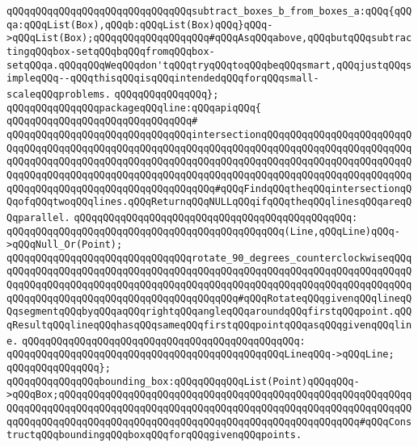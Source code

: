\newline
\verb|qQQqqQQqqQQqqQQqqQQqqQQqqQQqqQQqsubtract_boxes_b_from_boxes_a:qQQq{qQQqa:qQQqList(Box),qQQqb:qQQqList(Box)qQQq}qQQq->qQQqList(Box);qQQqqQQqqQQqqQQqqQQq#qQQqAsqQQqabove,qQQqbutqQQqsubtractingqQQqbox-setqQQqbqQQqfromqQQqbox-setqQQqa.qQQqqQQqWeqQQqdon'tqQQqtryqQQqtoqQQqbeqQQqsmart,qQQqjustqQQqsimpleqQQq--qQQqthisqQQqisqQQqintendedqQQqforqQQqsmall-scaleqQQqproblems.|\newline
\verb|qQQqqQQqqQQqqQQq};|\newline
\newline
\newline
\verb|qQQqqQQqqQQqqQQqpackageqQQqline:qQQqapiqQQq{|\newline
\verb|qQQqqQQqqQQqqQQqqQQqqQQqqQQqqQQq#|\newline
\verb|qQQqqQQqqQQqqQQqqQQqqQQqqQQqqQQqintersectionqQQqqQQqqQQqqQQqqQQqqQQqqQQqqQQqqQQqqQQqqQQqqQQqqQQqqQQqqQQqqQQqqQQqqQQqqQQqqQQqqQQqqQQqqQQqqQQqqQQqqQQqqQQqqQQqqQQqqQQqqQQqqQQqqQQqqQQqqQQqqQQqqQQqqQQqqQQqqQQqqQQqqQQqqQQqqQQqqQQqqQQqqQQqqQQqqQQqqQQqqQQqqQQqqQQqqQQqqQQqqQQqqQQqqQQqqQQqqQQqqQQqqQQqqQQqqQQqqQQqqQQqqQQqqQQq#qQQqFindqQQqtheqQQqintersectionqQQqofqQQqtwoqQQqlines.qQQqReturnqQQqNULLqQQqifqQQqtheqQQqlinesqQQqareqQQqparallel.|\newline
\verb|qQQqqQQqqQQqqQQqqQQqqQQqqQQqqQQqqQQqqQQqqQQqqQQq:|\newline
\verb|qQQqqQQqqQQqqQQqqQQqqQQqqQQqqQQqqQQqqQQqqQQqqQQq(Line,qQQqLine)qQQq->qQQqNull_Or(Point);|\newline
\newline
\verb|qQQqqQQqqQQqqQQqqQQqqQQqqQQqqQQqrotate_90_degrees_counterclockwiseqQQqqQQqqQQqqQQqqQQqqQQqqQQqqQQqqQQqqQQqqQQqqQQqqQQqqQQqqQQqqQQqqQQqqQQqqQQqqQQqqQQqqQQqqQQqqQQqqQQqqQQqqQQqqQQqqQQqqQQqqQQqqQQqqQQqqQQqqQQqqQQqqQQqqQQqqQQqqQQqqQQqqQQqqQQqqQQqqQQqqQQq#qQQqRotateqQQqgivenqQQqlineqQQqsegmentqQQqbyqQQqaqQQqrightqQQqangleqQQqaroundqQQqfirstqQQqpoint.qQQqResultqQQqlineqQQqhasqQQqsameqQQqfirstqQQqpointqQQqasqQQqgivenqQQqline.|\newline
\verb|qQQqqQQqqQQqqQQqqQQqqQQqqQQqqQQqqQQqqQQqqQQqqQQq:|\newline
\verb|qQQqqQQqqQQqqQQqqQQqqQQqqQQqqQQqqQQqqQQqqQQqqQQqLineqQQq->qQQqLine;|\newline
\verb|qQQqqQQqqQQqqQQq};|\newline
\newline
\verb|qQQqqQQqqQQqqQQqbounding_box:qQQqqQQqqQQqList(Point)qQQqqQQq->qQQqBox;qQQqqQQqqQQqqQQqqQQqqQQqqQQqqQQqqQQqqQQqqQQqqQQqqQQqqQQqqQQqqQQqqQQqqQQqqQQqqQQqqQQqqQQqqQQqqQQqqQQqqQQqqQQqqQQqqQQqqQQqqQQqqQQqqQQqqQQqqQQqqQQqqQQqqQQqqQQqqQQqqQQqqQQqqQQqqQQqqQQqqQQqqQQqqQQq#qQQqConstructqQQqboundingqQQqboxqQQqforqQQqgivenqQQqpoints.|\newline
